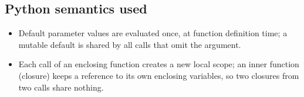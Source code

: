 \subsection{Python semantics used}
\begin{itemize}[itemsep=0pt]
 \item Default parameter values are evaluated once, at function definition time; a mutable default is shared by all
 calls that omit the argument.
 \item Each call of an enclosing function creates a new local scope; an inner function (closure) keeps a reference to
 its own enclosing variables, so two closures from two calls share nothing.
\end{itemize}


